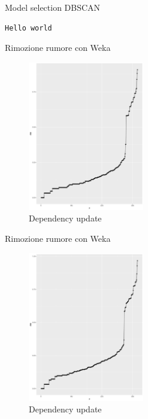 \documentclass{beamer}
\begin{document}
\begin{frame}[fragile]{Model selection DBSCAN}
  \begin{lstlisting}[style=sql]
      Hello world  
  \end{lstlisting}
\end{frame}

\begin{frame}{Rimozione rumore con Weka}
  \begin{figure}[bt]
    \begin{center}
    \includegraphics[width = 0.45\textwidth]{../img/eps-minpts6.pdf}
    \caption{Dependency update}
    \end{center}
  \end{figure}
\end{frame}

\begin{frame}{Rimozione rumore con Weka}
  \begin{figure}[bt]
    \begin{center}
    \includegraphics[width = 0.45\textwidth]{../img/eps-minpts10.pdf}
    \caption{Dependency update}
    \end{center}
  \end{figure}
\end{frame}
\end{document}
